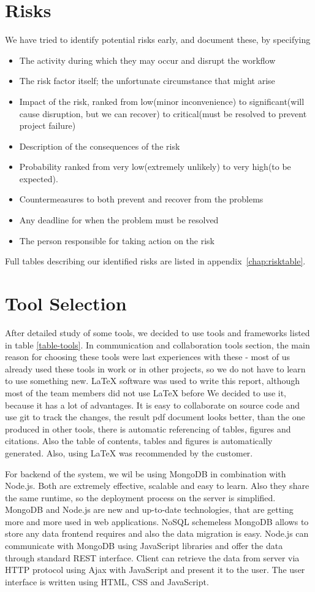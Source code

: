\section{Risks}
We have tried to identify potential risks early, and document these, by specifying
\begin{itemize}
\item The activity during which they may occur and disrupt the workflow
\item The risk factor itself; the unfortunate circumstance that might arise
\item Impact of the risk, ranked from low(minor inconvenience) to significant(will cause disruption, but we can recover) to critical(must be resolved to prevent project failure)
\item Description of the consequences of the risk
\item Probability ranked from very low(extremely unlikely) to very high(to be expected).
\item Countermeasures to both prevent and recover from the problems
\item Any deadline for when the problem must be resolved
\item The person responsible for taking action on the risk
\end{itemize}
Full tables describing our identified risks are listed in  appendix~\ref{chap:risktable}.

\section{Tool Selection}
After detailed study of some tools, we decided to use tools and frameworks listed in table \ref{table-tools}. In communication and collaboration tools section, the main reason for choosing these tools were last experiences with these - most of us already used these tools in work or in other projects, so we do not have to learn to use something new. LaTeX software was used to write this report, although most of the team members did not use LaTeX before We decided to use it, because it has a lot of advantages. It is easy to collaborate on source code and use git to track the changes, the result pdf document looks better, than the one produced in other tools, there is automatic referencing of tables, figures and citations. Also the table of contents, tables and figures is automatically generated. Also, using LaTeX was recommended by the customer.

For backend of the system, we wil be using MongoDB in combination with Node.js. Both are extremely effective, scalable and easy to learn. Also they share the same runtime, so the deployment process on the server is simplified. MongoDB and Node.js are new and up-to-date technologies, that are getting more and more used in web applications. NoSQL schemeless MongoDB allows to store any data frontend requires and also the data migration is easy. Node.js can communicate with MongoDB using JavaScript libraries and offer the data through standard REST interface. Client can retrieve the data from server via HTTP protocol using Ajax with JavaScript and present it to the user. The user interface is written using HTML, CSS and JavaScript.

